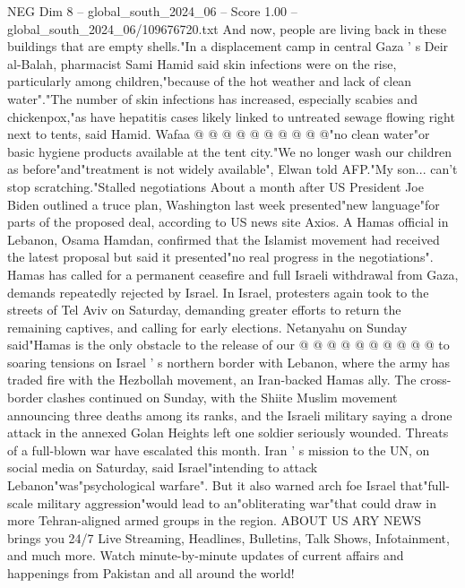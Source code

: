 \begin{textsample}{NEG Dim 8 – global\_south\_2024\_06 – Score 1.00 – global\_south\_2024\_06/109676720.txt}
And now, people are living back in these buildings that are empty shells."In a displacement camp in central Gaza ' s Deir al-Balah, pharmacist Sami Hamid said skin infections were on the rise, particularly among children,"because of the hot weather and lack of clean water"."The number of skin infections has increased, especially scabies and chickenpox,"as have hepatitis cases likely linked to untreated sewage flowing right next to tents, said Hamid.
Wafaa @ @ @ @ @ @ @ @ @ @"no clean water"or basic hygiene products available at the tent city."We no longer wash our children as before"and"treatment is not widely available", Elwan told AFP."My son... can't stop scratching."Stalled negotiations About a month after US President Joe Biden outlined a truce plan, Washington last week presented"new language"for parts of the proposed deal, according to US news site Axios.
A Hamas official in Lebanon, Osama Hamdan, confirmed that the Islamist movement had received the latest proposal but said it presented"no real progress in the negotiations".
Hamas has called for a permanent ceasefire and full Israeli withdrawal from Gaza, demands repeatedly rejected by Israel.
In Israel, protesters again took to the streets of Tel Aviv on Saturday, demanding greater efforts to return the remaining captives, and calling for early elections.
Netanyahu on Sunday said"Hamas is the only obstacle to the release of our @ @ @ @ @ @ @ @ @ @ to soaring tensions on Israel ' s northern border with Lebanon, where the army has traded fire with the Hezbollah movement, an Iran-backed Hamas ally.
The cross-border clashes continued on Sunday, with the Shiite Muslim movement announcing three deaths among its ranks, and the Israeli military saying a drone attack in the annexed Golan Heights left one soldier seriously wounded.
Threats of a full-blown war have escalated this month.
Iran ' s mission to the UN, on social media on Saturday, said Israel"intending to attack Lebanon"was"psychological warfare".
But it also warned arch foe Israel that"full-scale military aggression"would lead to an"obliterating war"that could draw in more Tehran-aligned armed groups in the region.
ABOUT US ARY NEWS brings you 24/7 Live Streaming, Headlines, Bulletins, Talk Shows, Infotainment, and much more.
Watch minute-by-minute updates of current affairs and happenings from Pakistan and all around the world!

\end{textsample}
